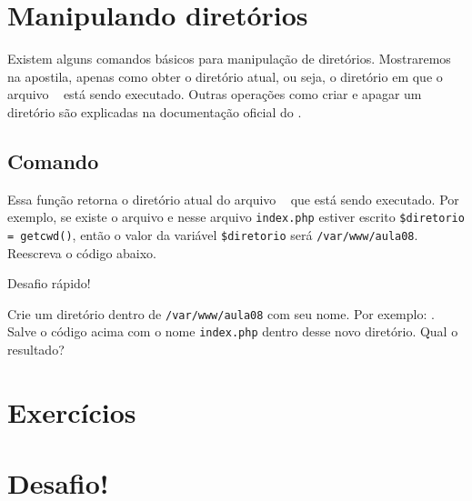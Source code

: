 \section{Manipulando diretórios}
\label{manipulando-diretorios}

Existem alguns comandos básicos para manipulação de diretórios. Mostraremos
na apostila, apenas como obter o diretório atual, ou seja, o diretório em que o
arquivo \phpextensao~ está sendo executado. Outras operações como criar e apagar
um diretório são explicadas na documentação oficial do \php.

\subsection{Comando \funcaogetcwd}
\label{comando-getcwd}

Essa função retorna o diretório atual do arquivo \php~ que está sendo executado.
Por exemplo, se existe o arquivo  e nesse
arquivo \texttt{index.php} estiver escrito \texttt{\$diretorio = getcwd()},
então o valor da variável \texttt{\$diretorio} será \texttt{/var/www/aula08}.
Reescreva o código abaixo.



\begin{framed}
{\Large Desafio rápido!}

Crie um diretório dentro de \texttt{/var/www/aula08} com seu nome. Por exemplo:
. Salve o código acima com o nome \texttt{index.php}
dentro desse novo diretório. Qual o resultado?
\end{framed}

\section{Exercícios}
\label{cap9-exercicios}

\section{Desafio!}
\label{cap9-desafio}